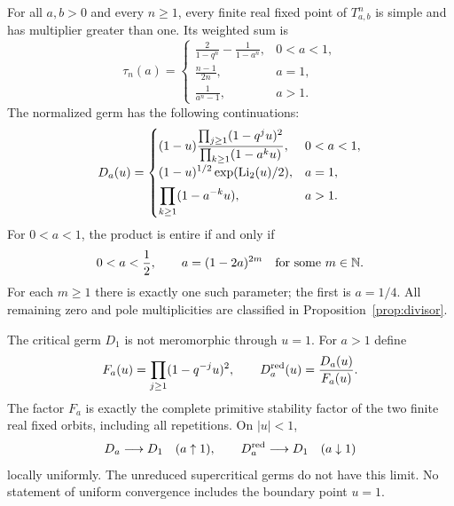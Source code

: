\begin{theorem}\label{thm:main}
For all $a,b>0$ and every $n\ge1$, every finite real fixed point of $T_{a,b}^n$
is simple and has multiplier greater than one. Its weighted sum is
\begin{equation}\label{eq:tau-main}
 \tau_n(a)=
 \begin{cases}
 \displaystyle\frac2{1-q^n}-\frac1{1-a^n},&0<a<1,\\[4pt]
 \displaystyle\frac{n-1}{2n},&a=1,\\[4pt]
 \displaystyle\frac1{a^n-1},&a>1.
 \end{cases}
\end{equation}
The normalized germ has the following continuations:
\begin{equation}\label{eq:products-main}
 D_a(u)=
 \begin{cases}
 \displaystyle(1-u)\frac{\prod_{j\ge1}(1-q^ju)^2}
 {\prod_{k\ge1}(1-a^ku)},&0<a<1,\\[7pt]
 \displaystyle(1-u)^{1/2}\exp(\operatorname{Li}_2(u)/2),&a=1,\\[4pt]
 \displaystyle\prod_{k\ge1}(1-a^{-k}u),&a>1.
 \end{cases}
\end{equation}
For $0<a<1$, the product is entire if and only if
\begin{equation}\label{eq:entire-main}
 0<a<\frac12,\qquad a=(1-2a)^{2m}\quad\hbox{for some }m\in\mathbb N.
\end{equation}
For each $m\ge1$ there is exactly one such parameter; the first is $a=1/4$.
All remaining zero and pole multiplicities are classified in
Proposition~\ref{prop:divisor}.
\end{theorem}

\begin{theorem}\label{thm:critical}
The critical germ $D_1$ is not meromorphic through $u=1$. For $a>1$ define
\begin{equation}\label{eq:reduced-definition}
 F_a(u)=\prod_{j\ge1}(1-q^{-j}u)^2,\qquad
 D_a^{\mathrm{red}}(u)=\frac{D_a(u)}{F_a(u)}.
\end{equation}
The factor $F_a$ is exactly the complete primitive stability factor of the two
finite real fixed orbits, including all repetitions. On $|u|<1$,
\begin{equation}\label{eq:limits-main}
 D_a\longrightarrow D_1\quad(a\uparrow1),\qquad
 D_a^{\mathrm{red}}\longrightarrow D_1\quad(a\downarrow1)
\end{equation}
locally uniformly. The unreduced supercritical germs do not have this limit.
No statement of uniform convergence includes the boundary point $u=1$.
\end{theorem}

